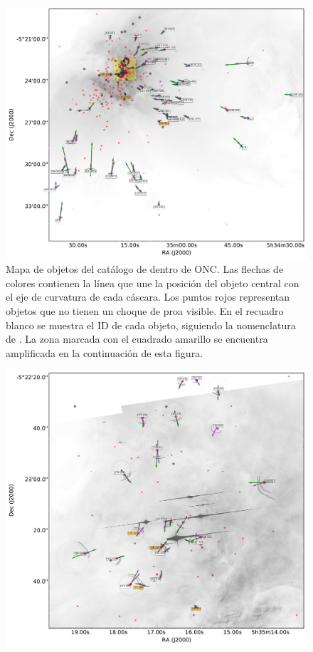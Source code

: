 \begin{figure}
  \centering
    \includegraphics[width=\linewidth]{./Figures/ll-pos-image-Luis}
  \caption{Mapa de objetos del catálogo de \citet{Gutierrez-Soto:2015a} dentro de ONC. Las flechas de colores contienen la línea que une la posición del objeto central con el eje de curvatura de cada cáscara. Los puntos rojos representan objetos que no tienen un choque de proa visible. En el recuadro blanco se muestra el ID de cada objeto, siguiendo la nomenclatura de \citet{ODell:1994a}. La zona marcada con el cuadrado amarillo se encuentra amplificada en la continuación de esta figura.}
  \label{fig:orion-map-LL}
\end{figure}

\begin{figure}
  \centering
  \ContinuedFloat
  \captionsetup{list=off, format=cont}  
  \includegraphics[width=\linewidth]{./Figures/ll-pos-image-zoom-Luis}
  \caption{}
  \label{orion-map-LL-2}
\end{figure}


